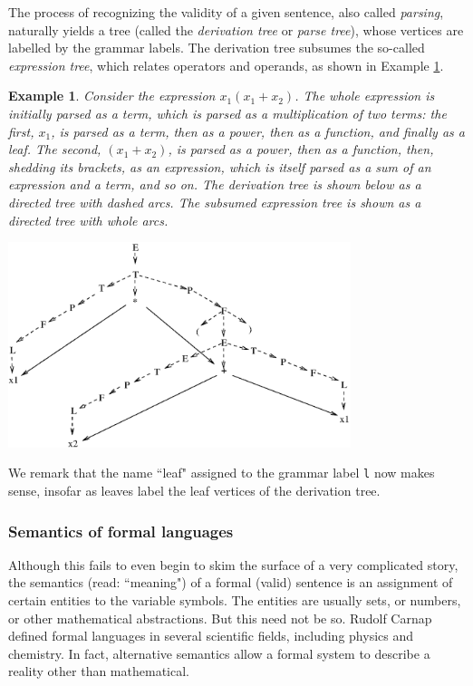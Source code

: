 \documentclass[a4paper]{book}
\theoremstyle{changebreak}                %
\newtheorem{eg}[result]{Example}
\begin{document}
The process of recognizing the validity of a given sentence, also
called {\it parsing}, naturally yields a tree (called
the {\it derivation tree} or {\it parse
  tree}), whose vertices are labelled by the grammar
labels. The derivation tree subsumes the so-called {\it expression
  tree}, which relates
operators and operands, as shown in
Example \ref{eg:derivtree}.

\begin{eg}
\label{eg:derivtree}
Consider the expression $x_1(x_1+x_2)$. The whole expression is
initially parsed as a term, which is parsed as a multiplication of two
terms: the first, $x_1$, is parsed as a term, then as a power, then as
a function, and finally as a leaf. The second, $(x_1+x_2)$, is parsed
as a power, then as a function, then, shedding its brackets, as an
expression, which is itself parsed as a sum of an expression and a
term, and so on. The derivation tree is shown below as a directed tree
with dashed arcs. The subsumed expression tree is shown as a directed
tree with whole arcs.
\begin{center}
\psfrag{*}{$\times$}
\psfrag{+}{$+$}
\includegraphics[width=10cm]{derivationtree}
\end{center}
\end{eg}

We remark that the name ``leaf" assigned to the grammar label {\tt l}
now makes sense, insofar as leaves label the leaf vertices of the
derivation tree.

\subsubsection{Semantics of formal languages}
Although this fails to even begin to skim the surface of a very
complicated story, the semantics (read: ``meaning")
of a formal (valid) sentence is an assignment
of certain entities to the variable
symbols. The entities are usually
sets, or numbers, or other mathematical abstractions. But
this need not be so. Rudolf Carnap defined formal
languages in several scientific fields, including physics and
chemistry. In fact, alternative semantics allow a formal system to
describe a reality other than mathematical.
\end{document}
